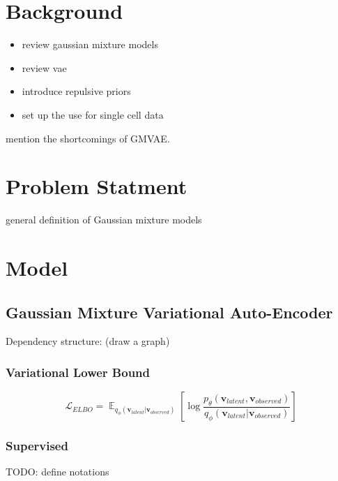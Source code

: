 \documentclass[twoside,11pt]{article}
\DeclareMathOperator{\E}{\mathbb{E}}
\begin{document}
\section{Background}


\begin{itemize}
    \item review gaussian mixture models
    \item review vae
    \item introduce repulsive priors
    \item set up the use for single cell data
\end{itemize}

mention the shortcomings of GMVAE.

\section{Problem Statment}

general definition of Gaussian mixture models


\section{Model}

\subsection{Gaussian Mixture Variational Auto-Encoder}

Dependency structure: (draw a graph)

\subsubsection{Variational Lower Bound}
\begin{equation} \label{ELBO}
\mathcal{L}_\textit{ELBO} = \E_{q_\phi (
    \bm{v}_\textit{latent} | \bm{v}_\textit{observed})} 
    \left[ \log \frac{p_\theta (\bm{v}_\textit{latent}, 
    \bm{v}_\textit{observed})}{ q_\phi (
    \bm{v}_\textit{latent} | \bm{v}_\textit{observed})} 
    \right]
\end{equation}

\subsubsection{Supervised}

TODO: define notations
\end{document}
